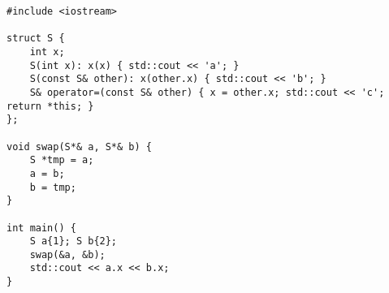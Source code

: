 \begin{lstlisting}[title=\href{https://godbolt.org/z/4i5N4c}{\texttt{godbolt.org/z/4i5N4c}}]
#include <iostream>

struct S { 
    int x;
    S(int x): x(x) { std::cout << 'a'; }
    S(const S& other): x(other.x) { std::cout << 'b'; }
    S& operator=(const S& other) { x = other.x; std::cout << 'c'; return *this; }
};

void swap(S*& a, S*& b) {
    S *tmp = a;
    a = b;
    b = tmp;
}

int main() {
    S a{1}; S b{2};
    swap(&a, &b);
    std::cout << a.x << b.x;
}
\end{lstlisting}
